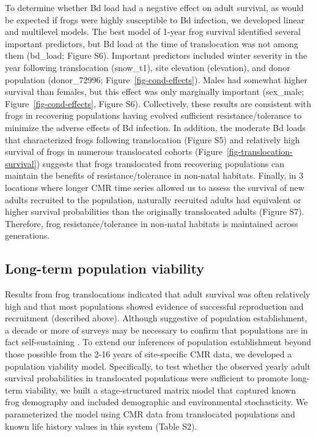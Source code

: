 \documentclass[9pt,twocolumn,twoside,lineno]{pnas-new}
\begin{document}
To determine whether Bd load had a negative effect on adult survival, as
would be expected if frogs were highly susceptible to Bd infection, we
developed linear and multilevel models. The best model of 1-year frog
survival identified several important predictors, but Bd load at the
time of translocation was not among them (bd\_load;
Figure S6). Important predictors included
winter severity in the year following translocation (snow\_t1), site
elevation (elevation), and donor population (donor\_72996;
Figure~\ref{fig-cond-effects}). Males had somewhat higher survival than
females, but this effect was only marginally important (sex\_male;
Figure~\ref{fig-cond-effects}, Figure S6).
Collectively, these results are consistent with frogs in recovering
populations having evolved sufficient resistance/tolerance to minimize
the adverse effects of Bd infection. In addition, the moderate Bd loads
that characterized frogs following translocation
(Figure S5) and relatively high survival of
frogs in numerous translocated cohorts
(Figure~\ref{fig-translocation-survival}) suggests that frogs
translocated from recovering populations can maintain the benefits of
resistance/tolerance in non-natal habitats. Finally, in 3 locations
where longer CMR time series allowed us to assess the survival of new
adults recruited to the population, naturally recruited adults had
equivalent or higher survival probabilities than the originally
translocated adults (Figure S7). Therefore,
frog resistance/tolerance in non-natal habitats is maintained across
generations.

\subsection*{Long-term population viability}

Results from frog translocations indicated that adult survival was often
relatively high and that most populations showed evidence of successful
reproduction and recruitment (described above). Although suggestive of
population establishment, a decade or more of surveys may be necessary
to confirm that populations are in fact self-sustaining
\citep{joseph2018}. To extend our inferences of population establishment
beyond those possible from the 2-16 years of site-specific CMR data, we
developed a population viability model. Specifically, to test whether
the observed yearly adult survival probabilities in translocated
populations were sufficient to promote long-term viability, we built a
stage-structured matrix model that captured known frog demography and
included demographic and environmental stochasticity. We parameterized
the model using CMR data from translocated populations and known life
history values in this system (Table S2).
\end{document}
